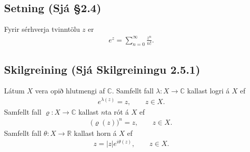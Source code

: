 \documentclass[a4paper,10pt,icelandic]{sphinxmanual}
\begin{document}
\subsection{Setning (Sjá \S{}2.4)}
\label{\detokenize{Kafli02:setning-sja-2-4}}
Fyrir sérhverja tvinntölu \(z\) er
\begin{equation*}
\begin{split}e^z=\sum_{n=0}^\infty \frac{z^n}{n!}.\end{split}
\end{equation*}

\subsection{Skilgreining (Sjá Skilgreiningu 2.5.1)}
\label{\detokenize{Kafli02:skilgreining-sja-skilgreiningu-2-5-1}}
Látum \(X\) vera opið hlutmengi af \({\mathbb{C}}\). Samfellt fall \(\lambda:X\to {\mathbb{C}}\) kallast logri á \(X\) ef
\begin{equation*}
\begin{split}e^{\lambda(z)}=z, \qquad z\in X.\end{split}
\end{equation*}
Samfellt fall \(\varrho:X\to {\mathbb{C}}\) kallast \(n\)\textendash{}ta rót á \(X\) ef
\begin{equation*}
\begin{split}\big(\varrho(z)\big)^n=z, \qquad z\in X.\end{split}
\end{equation*}
Samfellt fall \(\theta:X\to \mathbb{R}\) kallast horn á \(X\) ef
\begin{equation*}
\begin{split}z=|z|e^{i\theta(z)}, \qquad z\in X.\end{split}
\end{equation*}
\end{document}
